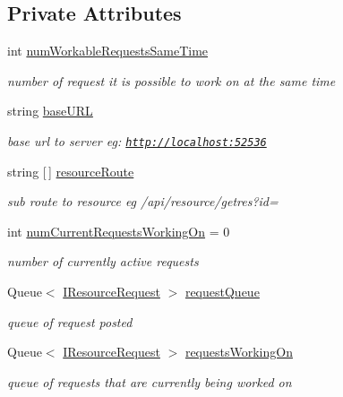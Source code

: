\subsection*{Private Attributes}
\begin{DoxyCompactItemize}
\item 
int \mbox{\hyperlink{class_resource_loader_ab0983780f3a6f7517a8377010dfd4fe7}{num\+Workable\+Requests\+Same\+Time}}
\begin{DoxyCompactList}\small\item\em number of request it is possible to work on at the same time \end{DoxyCompactList}\item 
string \mbox{\hyperlink{class_resource_loader_a63594097a2099f41637445a76f8df1a9}{base\+U\+RL}}
\begin{DoxyCompactList}\small\item\em base url to server eg\+: \href{http://localhost:52536}{\tt http\+://localhost\+:52536} \end{DoxyCompactList}\item 
string \mbox{[}$\,$\mbox{]} \mbox{\hyperlink{class_resource_loader_a16070d3fe56ca93ca9690f15d36df67b}{resource\+Route}}
\begin{DoxyCompactList}\small\item\em sub route to resource eg /api/resource/getres?id= \end{DoxyCompactList}\item 
int \mbox{\hyperlink{class_resource_loader_a3a96acf88c8727a7f76b56bbb483b706}{num\+Current\+Requests\+Working\+On}} = 0
\begin{DoxyCompactList}\small\item\em number of currently active requests \end{DoxyCompactList}\item 
Queue$<$ \mbox{\hyperlink{interface_i_resource_request}{I\+Resource\+Request}} $>$ \mbox{\hyperlink{class_resource_loader_af06b5459698c44c6acbb52c456fa2c71}{request\+Queue}}
\begin{DoxyCompactList}\small\item\em queue of request posted \end{DoxyCompactList}\item 
Queue$<$ \mbox{\hyperlink{interface_i_resource_request}{I\+Resource\+Request}} $>$ \mbox{\hyperlink{class_resource_loader_afbcaf8e71a04ea93dddd62f342b50bc8}{requests\+Working\+On}}
\begin{DoxyCompactList}\small\item\em queue of requests that are currently being worked on \end{DoxyCompactList}\end{DoxyCompactItemize}


